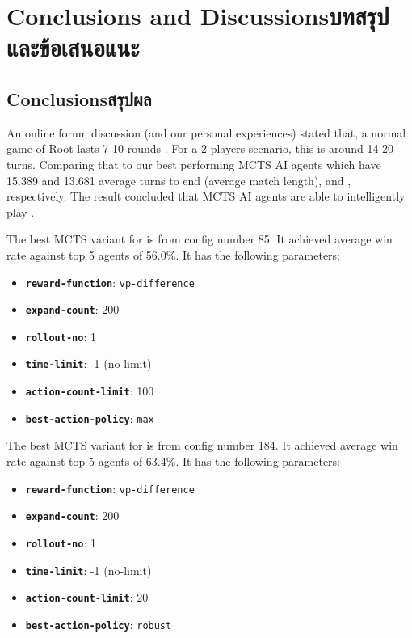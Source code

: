 \chapter{\ifenglish Conclusions and Discussions\else บทสรุปและข้อเสนอแนะ\fi}

\section{\ifenglish Conclusions\else สรุปผล\fi}

An online forum discussion (and our personal experiences) stated that, a normal game of Root lasts 7-10 rounds \cite{Reddit_TurnsToWin}. For a 2 players scenario, this is around 14-20 turns. Comparing that to our best performing MCTS AI agents which have 15.389 and 13.681 average turns to end (average match length), \Marquise{} and \Eyrie{}, respectively. The result concluded that MCTS AI agents are able to intelligently play \RootB{}.

The best MCTS variant for \Marquise{} is from config number 85. It achieved average win rate against top 5 \Eyrie{} agents of 56.0\%. It has the following parameters:
\begin{itemize}
    \item \textbf{\texttt{reward-function}}: \texttt{vp-difference}
    \item \textbf{\texttt{expand-count}}: 200
    \item \textbf{\texttt{rollout-no}}: 1
    \item \textbf{\texttt{time-limit}}: -1 (no-limit)
    \item \textbf{\texttt{action-count-limit}}: 100
    \item \textbf{\texttt{best-action-policy}}: \texttt{max}
\end{itemize}
The best MCTS variant for \Eyrie{} is from config number 184. It achieved average win rate against top 5 \Marquise{} agents of 63.4\%. It has the following parameters:
\begin{itemize}
    \item \textbf{\texttt{reward-function}}: \texttt{vp-difference}
    \item \textbf{\texttt{expand-count}}: 200
    \item \textbf{\texttt{rollout-no}}: 1
    \item \textbf{\texttt{time-limit}}: -1 (no-limit)
    \item \textbf{\texttt{action-count-limit}}: 20
    \item \textbf{\texttt{best-action-policy}}: \texttt{robust}
\end{itemize}

